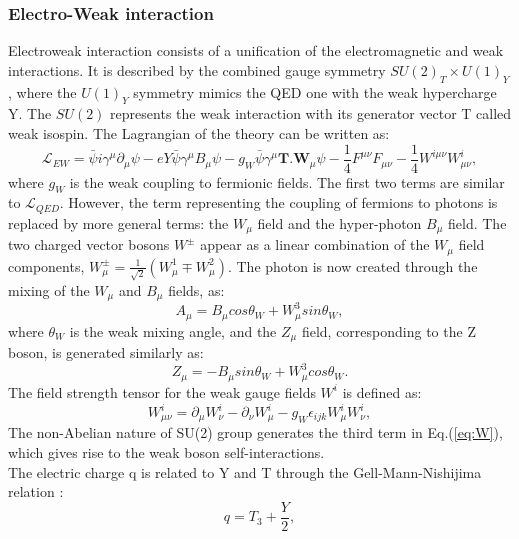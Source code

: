 \subsubsection{Electro-Weak interaction}
Electroweak interaction consists of a unification of the electromagnetic and weak interactions. It is described by the combined gauge symmetry $SU(2)_{T}\times U(1)_{Y}$, where the $U(1)_{Y}$ symmetry mimics the QED one with the weak hypercharge Y. The $SU(2)$ represents the weak interaction with its generator vector T called weak isospin. The Lagrangian of the theory can be written as: 
\begin{equation}
    \mathcal{L}_{EW} = \bar{\psi}i\gamma^\mu\partial_\mu\psi -eY\bar{\psi}\gamma^{\mu}B_{\mu}\psi-g_{W}\bar{\psi}\gamma^{\mu}\textbf{T.W$_\mu$}\psi
    -\frac{1}{4}F^{\mu\nu}F_{\mu\nu} - \frac{1}{4}W^{i\mu\nu}W^i_{\mu\nu},
\end{equation}
where $g_{W}$ is the weak coupling to fermionic fields. The first two terms are similar to $\mathcal{L}_{QED}$. However, the term representing the coupling of fermions to photons is replaced by more general terms: the $W_{\mu}$ field and the hyper-photon $B_{\mu}$ field. The two charged vector bosons $W^\pm$ appear as a linear combination of the $W_{\mu}$ field components, $W^{\pm}_{\mu} = \frac{1}{\sqrt{2}}(W^1_{\mu}\mp W^2_{\mu})$. The photon is now created through the mixing of the $W_{\mu}$ and $B_{\mu}$ fields, as:
\begin{equation}
    A_{\mu} = B_{\mu}cos\theta_{W} + W^3_{\mu}sin\theta_{W},
\end{equation}
where $\theta_{W}$ is the weak mixing angle, and the $Z_{\mu}$ field, corresponding to the Z boson, is generated similarly as: 
\begin{equation}
     Z_{\mu} = -B_{\mu}sin\theta_{W} + W^3_{\mu}cos\theta_{W}.
\end{equation}
The field strength tensor for the weak gauge fields $W^i$ is defined as:
\begin{equation}
    W^{i}_{\mu\nu} = \partial_{\mu}W^i_{\nu} - \partial_{\nu}W^i_{\mu} - g_{W}\epsilon_{ijk}W^i_{\mu}W^i_{\nu},
    \label{eq:W}
\end{equation}
The non-Abelian nature of SU(2) group generates the third term in Eq.(\ref{eq:W}), which gives rise to the weak boson self-interactions. \\
The electric charge q is related to Y and T through the Gell-Mann-Nishijima relation \cite{Gell}:
\begin{equation}
    q = T_3 + \frac{Y}{2},
\end{equation}
